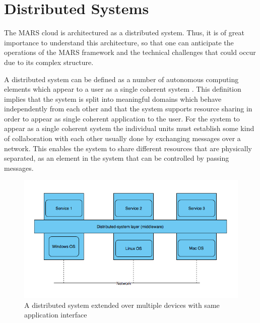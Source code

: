 \section{Distributed Systems}

    The MARS cloud is architectured as a distributed system. Thus, it is of great importance to understand
    this architecture, so that one can anticipate the operations of the MARS framework and
    the technical challenges that could occur due to its complex structure.
    \par
    A distributed system can be defined as a number of autonomous computing elements which 
    appear to a user as a single coherent system \cite[p.~2]{DistributedSystems}. This definition implies that the system is split into meaningful domains which behave 
    independently from each other and that the system supports resource sharing in order to appear as single coherent application to the user. 
    For the system to appear as a single coherent system the individual units must establish some kind of collaboration
    with each other usually done by exchanging messages over a network. This enables the system to share different resources that are physically separated, 
    as an element in the system that can be controlled by passing messages.


    

    \begin{figure}[H]
        \centering \includegraphics[scale=0.5]{grafiken/distributedSystem.png}
        \caption{A distributed system extended over multiple devices with same application 
        interface \cite[p.~5]{DistributedSystems}}
        \label{fig:distributedSystem}
    \end{figure}

